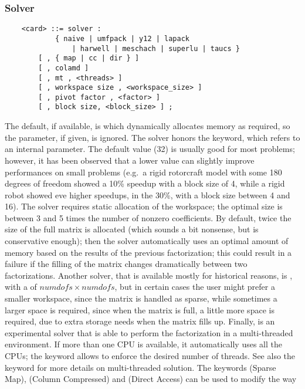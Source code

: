 \subsubsection{Solver}   
\begin{verbatim}
    <card> ::= solver :
            { naive | umfpack | y12 | lapack 
                | harwell | meschach | superlu | taucs }
        [ , { map | cc | dir } ]
        [ , colamd ]
        [ , mt , <threads> ]
        [ , workspace size , <workspace_size> ] 
        [ , pivot factor , <factor> ]
        [ , block size, <block_size> ] ;
\end{verbatim}
The default, if available, is  which dynamically
allocates memory as required, so the  
parameter, if given, is ignored.
The  solver honors the  keyword,
which refers to an internal parameter.
The default value (32) is usually good for most problems; however,
it has been observed that a lower value can slightly improve
performances on small problems (e.g.\ a rigid rotorcraft model
with some 180 degrees of freedom showed a 10\% speedup with 
a block size of 4, while a rigid robot showed eve higher speedups,
in the 30\%, with a block size between 4 and 16).
The  solver requires static allocation of the workspace;
the optimal size is between 3 and 5 times the number of nonzero 
coefficients.
By default, twice the size of the full matrix is allocated
(which sounds a bit nonsense, but is conservative enough);
then the solver automatically uses an optimal amount of memory
based on the results of the previous factorization; this could
result in a failure if the filling of the matrix changes 
dramatically between two factorizations.
Another solver, that is available mostly for historical reasons, 
is , with a 
of $ numdofs\times{numdofs} $, but in certain cases the user
might prefer a smaller workspace, since the matrix is handled as sparse,
while sometimes a larger space is required, since when the matrix is
full, a little more space is required, due to extra storage needs when
the matrix fills up.
Finally,  is an experimental solver that is able to perform
the factorization in a multi-threaded environment.
If more than one CPU is available, it automatically uses all the CPUs;
the keyword  allows to enforce the desired number of threads.
See also the  keyword for more details on multi-threaded
solution.
The keywords  (Sparse Map),  (Column Compressed)
and  (Direct Access) can be used to modify the way
